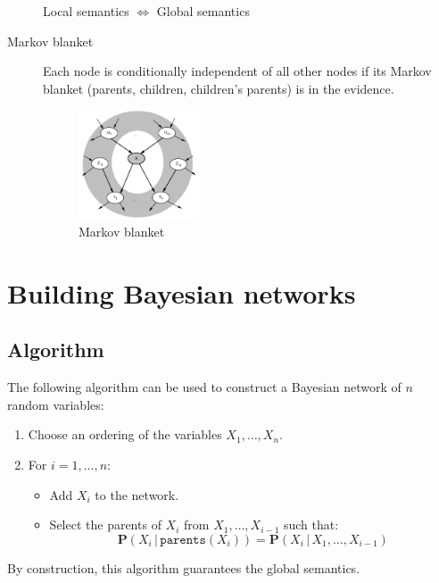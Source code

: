 \begin{description}
        \begin{theorem}
            Local semantics $\iff$ Global semantics
        \end{theorem}
        
    
    \item[Markov blanket]
        Each node is conditionally independent of all other nodes 
        if its Markov blanket (parents, children, children's parents) is in the evidence.
        \begin{figure}[h]
            \centering
            \includegraphics[width=0.35\textwidth]{img/_markov_blanket.pdf}
            \caption{Markov blanket}
        \end{figure}
\end{description}



\section{Building Bayesian networks}

\subsection{Algorithm}
The following algorithm can be used to construct a Bayesian network of $n$ random variables:
\begin{enumerate}
    \item Choose an ordering of the variables $X_1, \dots, X_n$.
    \item For $i=1, \dots, n$:
        \begin{itemize}
            \item Add $X_i$ to the network.
            \item Select the parents of $X_i$ from $X_1, \dots, X_{i-1}$ such that:
                \[ \textbf{P}(X_i \,\vert\, \texttt{parents}(X_i)) = 
                    \textbf{P}(X_i \,\vert\, X_1, \dots, X_{i-1}) \]
        \end{itemize}
\end{enumerate}
By construction, this algorithm guarantees the global semantics.

